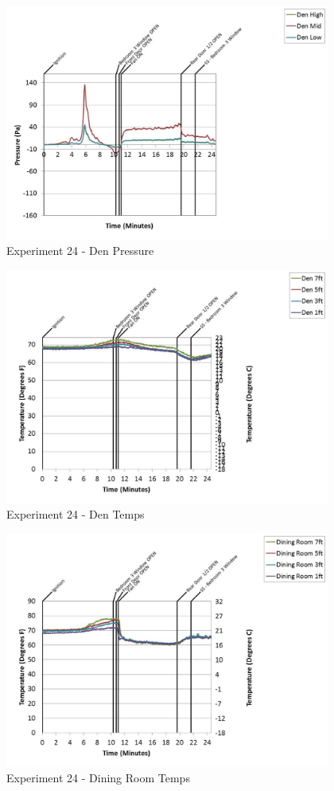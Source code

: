 \documentclass{article}
\begin{document}
\begin{appendices}
	\begin{figure}[h!]
		\centering
		\includegraphics[height=3.05in]{0_Images/Results_Charts/Exp_24_Charts/DenPressure.pdf}
		\caption{Experiment 24 - Den Pressure}
	\end{figure}
 
	\clearpage

	\begin{figure}[h!]
		\centering
		\includegraphics[height=3.05in]{0_Images/Results_Charts/Exp_24_Charts/DenTemps.pdf}
		\caption{Experiment 24 - Den Temps}
	\end{figure}
 

	\begin{figure}[h!]
		\centering
		\includegraphics[height=3.05in]{0_Images/Results_Charts/Exp_24_Charts/DiningRoomTemps.pdf}
		\caption{Experiment 24 - Dining Room Temps}
	\end{figure}
 

\end{appendices}
\end{document}
